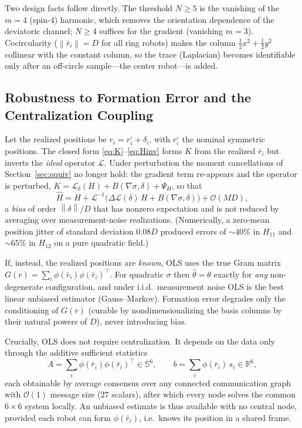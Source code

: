 \documentclass[journal]{IEEEtran}
\newcommand{\R}{\mathbb{R}}
\newcommand{\Sym}{\mathbb{S}}
\newcommand{\norm}[1]{\left\lVert #1 \right\rVert}
\begin{document}
Two design facts follow directly. The threshold $N\ge5$ is the vanishing of the
$m=4$ (spin-$4$) harmonic, which removes the orientation dependence of the
deviatoric channel; $N\ge4$ suffices for the gradient (vanishing $m=3$).
Cocircularity ($\norm{\bar r_{i}}=D$ for all ring robots) makes the column
$\tfrac12x^{2}+\tfrac12y^{2}$ collinear with the constant column, so the trace
(Laplacian) becomes identifiable only after an off-circle sample---the center
robot---is added.

\subsection{Robustness to Formation Error and the Centralization Coupling}
\label{sec:robust}

Let the realized positions be $r_{i}=r_{i}^{\circ}+\delta_{i}$, with $r_{i}^{\circ}$
the nominal symmetric positions. The closed form \eqref{eq:K}--\eqref{eq:Hinv}
forms $K$ from the realized $\bar r_{i}$ but inverts the \emph{ideal} operator
$\mathcal{L}$. Under perturbation the moment cancellations of
Section~\ref{sec:equiv} no longer hold: the gradient term re-appears and the
operator is perturbed, $K=\mathcal{L}_{\delta}(H)+B(\nabla\sigma,\delta)+\Psi_H$,
so that
\begin{equation}
\widehat{H}=H+\mathcal{L}^{-1}\!\big(\Delta\mathcal{L}(\delta)\,H+B(\nabla\sigma,\delta)\big)+\mathcal{O}(MD),
\end{equation}
a \emph{bias} of order $\norm{\delta}/D$ that has nonzero expectation and is not
reduced by averaging over measurement-noise realizations. (Numerically, a
zero-mean position jitter of standard deviation $0.08D$ produced errors of
$\sim40\%$ in $H_{11}$ and $\sim65\%$ in $H_{12}$ on a pure quadratic field.)

If, instead, the realized positions are \emph{known}, OLS uses the true Gram
matrix $G(r)=\sum_{i}\phi(\bar r_{i})\phi(\bar r_{i})^{\!\top}$. For quadratic
$\sigma$ then $\hat\theta=\theta$ exactly for \emph{any} non-degenerate
configuration, and under i.i.d.\ measurement noise OLS is the best linear unbiased
estimator (Gauss--Markov). Formation error degrades only the conditioning of
$G(r)$ (curable by nondimensionalizing the basis columns by their natural powers
of $D$), never introducing bias.

Crucially, OLS does not require centralization. It depends on the data only
through the additive sufficient statistics
\begin{equation}
A=\sum_{i}\phi(\bar r_{i})\phi(\bar r_{i})^{\!\top}\in\Sym^{6},
\qquad b=\sum_{i}\phi(\bar r_{i})\,s_{i}\in\R^{6},
\end{equation}
each obtainable by average consensus over any connected communication graph with
$\mathcal{O}(1)$ message size ($27$ scalars), after which every node solves the
common $6\times6$ system locally. An unbiased estimate is thus available with no
central node, provided each robot can form $\phi(\bar r_{i})$, i.e.\ knows its
position in a shared frame.
\end{document}
